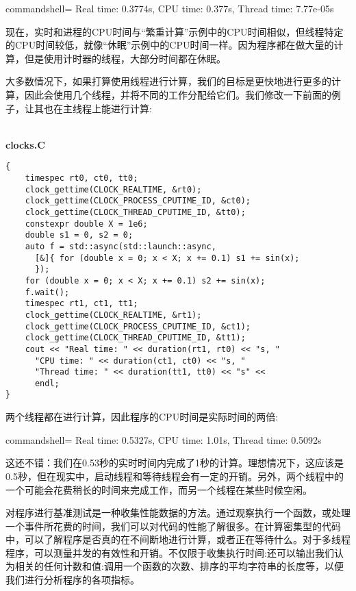 \begin{tcblisting}{commandshell={}}
Real time: 0.3774s, CPU time: 0.377s, Thread time: 7.77e-05s
\end{tcblisting}

现在，实时和进程的CPU时间与“繁重计算”示例中的CPU时间相似，但线程特定的CPU时间较低，就像“休眠”示例中的CPU时间一样。因为程序都在做大量的计算，但是使用计时器的线程，大部分时间都在休眠。

大多数情况下，如果打算使用线程进行计算，我们的目标是更快地进行更多的计算，因此会使用几个线程，并将不同的工作分配给它们。我们修改一下前面的例子，让其也在主线程上能进行计算:

\hspace*{\fill} \\ %
\noindent
\textbf{clocks.C}
\begin{lstlisting}[style=styleCXX]
{
	timespec rt0, ct0, tt0;
	clock_gettime(CLOCK_REALTIME, &rt0);
	clock_gettime(CLOCK_PROCESS_CPUTIME_ID, &ct0);
	clock_gettime(CLOCK_THREAD_CPUTIME_ID, &tt0);
	constexpr double X = 1e6;
	double s1 = 0, s2 = 0;
	auto f = std::async(std::launch::async,
	  [&]{ for (double x = 0; x < X; x += 0.1) s1 += sin(x);
	  });
	for (double x = 0; x < X; x += 0.1) s2 += sin(x);
	f.wait();
	timespec rt1, ct1, tt1;
	clock_gettime(CLOCK_REALTIME, &rt1);
	clock_gettime(CLOCK_PROCESS_CPUTIME_ID, &ct1);
	clock_gettime(CLOCK_THREAD_CPUTIME_ID, &tt1);
	cout << "Real time: " << duration(rt1, rt0) << "s, "
	  "CPU time: " << duration(ct1, ct0) << "s, "
	  "Thread time: " << duration(tt1, tt0) << "s" <<
	  endl;
}
\end{lstlisting}

两个线程都在进行计算，因此程序的CPU时间是实际时间的两倍:

\begin{tcblisting}{commandshell={}}
Real time: 0.5327s, CPU time: 1.01s, Thread time: 0.5092s
\end{tcblisting}

这还不错：我们在0.53秒的实时时间内完成了1秒的计算。理想情况下，这应该是0.5秒，但在现实中，启动线程和等待线程会有一定的开销。另外，两个线程中的一个可能会花费稍长的时间来完成工作，而另一个线程在某些时候空闲。

对程序进行基准测试是一种收集性能数据的方法。通过观察执行一个函数，或处理一个事件所花费的时间，我们可以对代码的性能了解很多。在计算密集型的代码中，可以了解程序是否真的在不间断地进行计算，或者正在等待什么。对于多线程程序，可以测量并发的有效性和开销。不仅限于收集执行时间:还可以输出我们认为相关的任何计数和值:调用一个函数的次数、排序的平均字符串的长度等，以便我们进行分析程序的各项指标。


